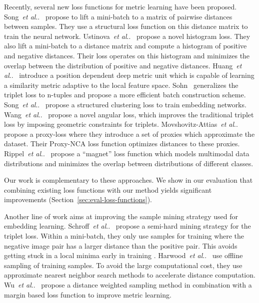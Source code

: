\documentclass[10pt,journal,compsoc]{IEEEtran}
\makeatletter
\DeclareRobustCommand\onedot{\futurelet\@let@token\@onedot}
\def\@onedot{\ifx\@let@token.\else.\null\fi\xspace}
\def\etal{\emph{et al}\onedot}
\makeatother
\begin{document}
Recently, several new loss functions for metric learning have been proposed. 
Song~\etal~\cite{oh2016deep} propose to lift a mini-batch to a matrix of pairwise distances between 
samples. They use a structural loss function on this distance matrix to train the neural network.
Ustinova~\etal~\cite{ustinova2016histogram} propose a novel histogram loss. They also lift a
mini-batch to a distance matrix and compute a histogram of positive and negative distances. Their loss operates on 
this histogram and minimizes the overlap between the distribution of positive and negative distances.
Huang~\etal~\cite{huang2016local} introduce a position dependent deep metric unit which 
is capable of learning a similarity metric adaptive to the local feature space.
Sohn~\cite{sohn2016improved} generalizes the triplet loss to n-tuples and propose a more efficient 
batch construction scheme.
Song~\etal~\cite{song2017cvpr} propose a structured clustering loss to train embedding networks.
Wang~\etal~\cite{wang2017iccv} propose a novel angular loss, which improves the traditional triplet loss by imposing geometric constraints for triplets.
Movshovitz-Attias~\etal~\cite{movshovitz-attias2017iccv} propose a proxy-loss where they introduce a set of proxies which approximate the dataset. 
Their Proxy-\ac{NCA} loss function optimizes distances to these proxies. 
Rippel~\etal~\cite{rippel2015metric} propose a ``magnet'' loss function which models multimodal data distributions and
minimizes the overlap between distributions of different classes.

Our work is complementary to these approaches. 
We show in our evaluation that combining existing loss functions with our 
method yields significant improvements (Section~\ref{sec:eval-loss-functions}).

Another line of work aims at improving the sample mining strategy used for
embedding learning. Schroff~\etal~\cite{schroff2015facenet} propose a
semi-hard mining strategy for the triplet loss. Within a mini-batch, they only
use samples for training where the negative image pair has a larger distance
than the positive pair. This avoids getting stuck in a local minima early in
training \cite{schroff2015facenet}.  Harwood~\etal~\cite{harwood2017iccv} use
offline sampling of training samples. To avoid the large computational cost,
they use approximate nearest neighbor search methods to accelerate distance
computation. Wu~\etal~\cite{wu2017iccv} propose a distance weighted sampling
method in combination with a margin based loss function to improve metric
learning.
\end{document}
